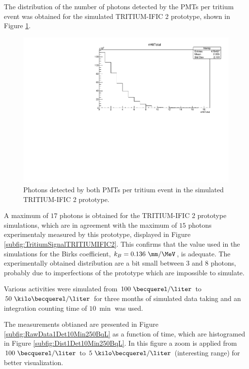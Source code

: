 The distribution of the number of photons detected by the PMTs per tritium event was obtained for the simulated TRITIUM-IFIC 2 prototype, shown in Figure \ref{fig:SimulatedPhotonsDetected}.

\begin{figure}[hbtp]
\centering
\includegraphics[scale=0.65]{Figures/8SimulationsResults/82TRITIUMMonitor/821TRITIUMIFIC2/PhotonsDetected_simulation.pdf}
\caption{Photons detected by both PMTs per tritium event in the simulated TRITIUM-IFIC 2 prototype.\label{fig:SimulatedPhotonsDetected}}
\end{figure}

A maximum of $17$ photons is obtained for the TRITIUM-IFIC 2 prototype simulations, which are in agreement with the maximum of $15$ photons experimentaly measured by this prototype, displayed in Figure \ref{subfig:TritiumSignalTRITIUMIFIC2}. This confirms that the value used in the simulations for the Birks coefficient, $k_B=0.136~\mm/\MeV$, is adequate. The experimentally obtained distribution are a bit small between $3$ and $8$ photons, probably due to imperfections of the prototype which are impossible to simulate.

Various activities were simulated from $100~\becquerel/\liter$ to $50~\kilo\becquerel/\liter$ for three months of simulated data taking and an integration counting time of $10~\min$ was used.

The measurements obtianed are presented in Figure \ref{subfig:RawData1Det10Min250BqL} as a function of time, which are histogramed in Figure \ref{subfig:Dist1Det10Min250BqL}. In this figure a zoom is applied from $100~\becquerel/\liter$ to $5~\kilo\becquerel/\liter$ (interesting range) for better visualization.

